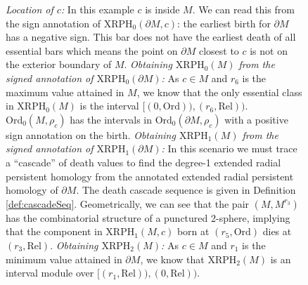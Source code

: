 \documentclass[a4paper,11pt]{article}
\theoremstyle{definition}
\begin{document}
\begin{figure}[htbp]
 \caption{
 \emph{Location of $c$:} In this example $c$ is inside $M$. We can read this from the sign annotation of  $\mathrm{XRPH}_0(\partial M,c)$: the earliest birth for $\partial M$ has a negative sign. 
 This bar does not have the earliest death of all essential bars which means the point on $\partial M$ closest to $c$ is not on the exterior boundary of $M$.
\emph{Obtaining $\mathrm{XRPH}_0(M)$ from the signed annotation of $\mathrm{XRPH}_0(\partial M)$:} 
As $c\in M$ and $r_6$ is the maximum value attained in $M$,  we know that the only essential class in $\mathrm{XRPH}_0(M)$ is  the interval $[(0, \mathrm{Ord})), (r_6, \mathrm{Rel}))$.
$\mathrm{Ord}_0(M, \rho_c)$ has the intervals in $\mathrm{Ord}_0(\partial M,\rho_c)$ with a positive sign annotation on the birth.
\emph{Obtaining $\mathrm{XRPH}_1(M)$ from the signed annotation of $\mathrm{XRPH}_1(\partial M)$:} 
In this scenario we must trace a ``cascade'' of death values to find the degree-1 extended radial persistent homology from the annotated extended radial persistent homology of $\partial M$. The death cascade sequence is given in Definition \ref{def:cascadeSeq}. Geometrically, we can see that the pair $(M,M^{r_3})$ has the combinatorial structure of a punctured 2-sphere, implying that the component in $\mathrm{XRPH}_1(M,c)$ born at $(r_5,\mathrm{Ord})$ dies at $(r_3,\mathrm{Rel})$.
\emph{Obtaining $\mathrm{XRPH}_2(M)$:} As $c\in M$ and $r_1$ is the minimum value attained in $\partial M$, we know that $\mathrm{XRPH}_2(M)$ is an interval module over $[(r_1, \mathrm{Rel})), (0, \mathrm{Rel}))$.} 
\label{fig:four-panel2}
\end{figure}
\medskip 
\end{document}
